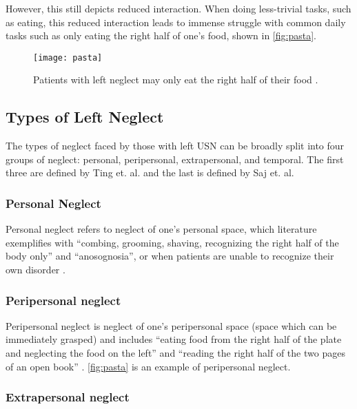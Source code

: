 However, this still depicts reduced interaction. When doing less-trivial tasks,
such as eating, this reduced interaction leads to immense struggle with common
daily tasks such as only eating the right half of one’s food, shown in
\autoref{fig:pasta}.

\begin{figure}[h]
  \centering
  \texttt{[image: pasta]}
  \caption[Example of symptoms of left neglect]{Patients with left neglect may
    only eat the right half of their food \cite{sutton_left_nodate}.} 
  \label{fig:pasta}
\end{figure}

\subsection{Types of Left Neglect}

The types of neglect faced by those with left USN can be broadly split into
four groups of neglect: personal, peripersonal, extrapersonal, and
temporal. The first three are defined by Ting et. al. and the last is defined
by Saj et. al. 

\subsubsection{Personal Neglect}

Personal neglect refers to neglect of one’s personal space, which literature
exemplifies with ``combing, grooming, shaving, recognizing the right half of the
body only'' and ``anosognosia'', or when patients are unable to recognize their
own disorder \cite{ting_visual_2011}.

\subsubsection{Peripersonal neglect}

Peripersonal neglect is neglect of one’s peripersonal space (space which can be
immediately grasped) and includes ``eating food from the right half of the plate
and neglecting the food on the left'' and ``reading the right half of the two
pages of an open book'' \cite{ting_visual_2011}. \autoref{fig:pasta} is an
example of peripersonal neglect.

\subsubsection{Extrapersonal neglect}

